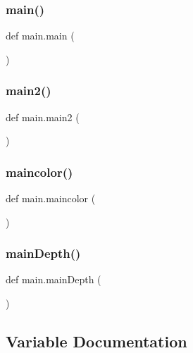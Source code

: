 \mbox{\label{namespacemain_af613cea4cba4fb7de8e40896b3368945}} 
\subsubsection{\texorpdfstring{main()}{main()}}
{\footnotesize\ttfamily def main.\+main (\begin{DoxyParamCaption}{ }\end{DoxyParamCaption})}

\mbox{\label{namespacemain_a80860d59bdf4a47bf23d077b5646b8c5}} 
\subsubsection{\texorpdfstring{main2()}{main2()}}
{\footnotesize\ttfamily def main.\+main2 (\begin{DoxyParamCaption}{ }\end{DoxyParamCaption})}

\mbox{\label{namespacemain_a4dd127bf5aff068f91de46dfc931a62f}} 
\subsubsection{\texorpdfstring{maincolor()}{maincolor()}}
{\footnotesize\ttfamily def main.\+maincolor (\begin{DoxyParamCaption}{ }\end{DoxyParamCaption})}

\mbox{\label{namespacemain_aec122b8c24a18ea2a68a0a902474a048}} 
\subsubsection{\texorpdfstring{main\+Depth()}{mainDepth()}}
{\footnotesize\ttfamily def main.\+main\+Depth (\begin{DoxyParamCaption}{ }\end{DoxyParamCaption})}



\subsection{Variable Documentation}
\mbox{\label{namespacemain_a562ba179d38eb6abbb9a1c3cc2b71de9}} 

